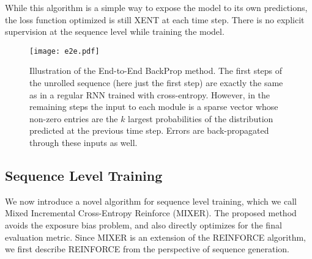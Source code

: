 \documentclass{article} \usepackage{iclr2016_conference,times}
\begin{document}
While this algorithm is a simple way to expose the model to its own predictions, the loss function optimized is still XENT at each time step. 
There is no explicit supervision at the sequence level while training the model. 
\begin{figure}[!t]
\begin{center}
\texttt{[image: e2e.pdf]}
\end{center}
\caption{Illustration of the End-to-End BackProp method. The first 
  steps of the unrolled sequence (here just the first step) are exactly the same
  as in a regular RNN trained with cross-entropy. However, in the remaining
  steps the input to each module is a sparse
  vector whose non-zero entries are the $k$ largest probabilities
  of the distribution predicted at the previous time step. Errors are
  back-propagated through these inputs as well.}
\label{fig:e2e}
\end{figure}

\subsection{Sequence Level Training}
We now introduce a novel algorithm for sequence level training, which we call Mixed Incremental Cross-Entropy Reinforce (MIXER). The proposed method avoids the exposure bias problem, 
and also directly optimizes for the final evaluation metric. 
Since MIXER is an extension of the REINFORCE algorithm, we first describe REINFORCE 
from the perspective of sequence generation. 
\end{document}
